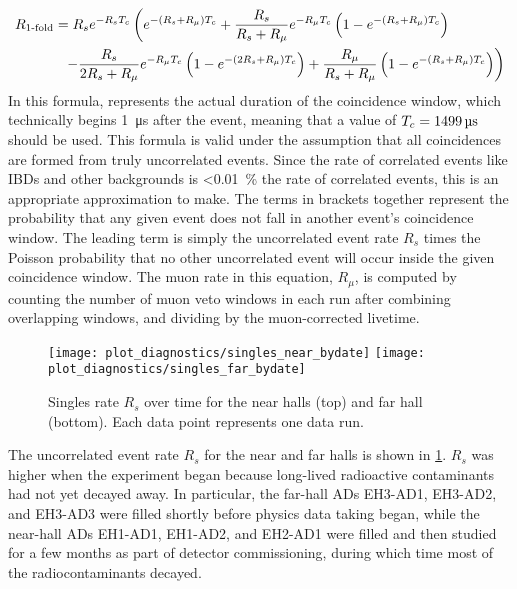 \begin{align}
    \label{eq:rsingles}
    \begin{split}
        R_{\text{\fold{1}}}
          &= R_s e^{-R_s\tc}
          \left(
              e^{-(R_s + R_\mu)\tc} +
              \frac{R_s}{R_s+R_\mu} e^{-R_\mu\tc}
              \left(
                  1 - e^{-(R_s + R_\mu)\tc}
              \right)
          \right. \\
          &\ \ %
          \left. - \frac{R_s}{2R_s + R_\mu} e^{-R_\mu\tc}
              \left(
                  1 - e^{-(2R_s + R_\mu)\tc}
              \right) +
              \frac{R_\mu}{R_s + R_\mu}
              \left(
                  1 - e^{-(R_s + R_\mu)\tc}
              \right)
          \right)
    \end{split}
\end{align}
In this formula, \tc{} represents the actual duration of the coincidence window,
which technically begins \SI{1}{\micro\second} after the event,
meaning that a value of $T_c=\SI{1499}{\micro\second}$ should be used.
This formula is valid under the assumption that all 
coincidences are formed from truly uncorrelated events.
Since the rate of correlated events like IBDs and other backgrounds
is \SI{<0.01}{\percent} the rate of correlated events,
this is an appropriate approximation to make.
The terms in brackets together represent the probability
that any given event does not fall in another event's coincidence window.
The leading term is simply the uncorrelated event rate $R_s$ times
the Poisson probability that no other uncorrelated event will occur
inside the given coincidence window.
The muon rate in this equation, $R_\mu$, is computed
by counting the number of muon veto windows in each run
after combining overlapping windows, and dividing by the muon-corrected
livetime.

\begin{figure}
    \texttt{[image: plot\_diagnostics/singles\_near\_bydate]}
    \texttt{[image: plot\_diagnostics/singles\_far\_bydate]}
    \caption{
        Singles rate $R_s$ over time for
        the near halls (top) and far hall (bottom).
        Each data point represents one data run.
    }
    \label{fig:singles}
\end{figure}

The uncorrelated event rate $R_s$ for the near and far halls is shown in
\cref{fig:singles}.
$R_s$ was higher when the experiment began because long-lived
radioactive contaminants had not yet decayed away.
In particular, the far-hall ADs EH3-AD1, EH3-AD2, and EH3-AD3
were filled shortly before physics data taking began,
while the near-hall ADs EH1-AD1, EH1-AD2, and EH2-AD1
were filled and then studied for a few months
as part of detector commissioning, during which time
most of the radiocontaminants decayed.

